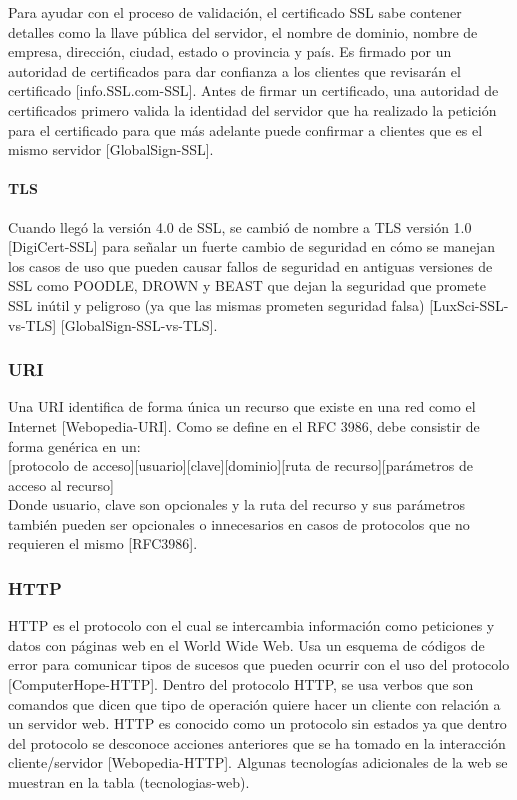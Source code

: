Para ayudar con el proceso de validación, el certificado SSL sabe contener detalles como la llave pública del servidor, el nombre de dominio, nombre de empresa, dirección, ciudad, estado o provincia y país. Es firmado por un autoridad de certificados para dar confianza a los clientes que revisarán el certificado [info.SSL.com-SSL]. Antes de firmar un certificado, una autoridad de certificados primero valida la identidad del servidor que ha realizado la petición para el certificado para que más adelante puede confirmar a clientes que es el mismo servidor [GlobalSign-SSL].

\paragraph{TLS}
Cuando llegó la versión 4.0 de SSL, se cambió de nombre a TLS versión 1.0 [DigiCert-SSL] para señalar un fuerte cambio de seguridad en cómo se manejan los casos de uso que pueden causar fallos de seguridad en antiguas versiones de SSL como POODLE, DROWN y BEAST que dejan la seguridad que promete SSL inútil y peligroso (ya que las mismas prometen seguridad falsa) [LuxSci-SSL-vs-TLS] [GlobalSign-SSL-vs-TLS].

\subsubsection{URI}
Una URI identifica de forma única un recurso que existe en una red como el Internet [Webopedia-URI]. Como se define en el RFC 3986, debe consistir de forma genérica en un:\\[1em]
[protocolo de acceso][usuario][clave][dominio][ruta de recurso][parámetros de acceso al recurso]\\[1em]
Donde usuario, clave son opcionales y la ruta del recurso y sus parámetros también pueden ser opcionales o innecesarios en casos de protocolos que no requieren el mismo [RFC3986].

\subsubsection{HTTP}
HTTP es el protocolo con el cual se intercambia información como peticiones y datos con páginas web en el World Wide Web. Usa un esquema de códigos de error para comunicar tipos de sucesos que pueden ocurrir con el uso del protocolo [ComputerHope-HTTP]. Dentro del protocolo HTTP, se usa verbos que son comandos que dicen que tipo de operación quiere hacer un cliente con relación a un servidor web. HTTP es conocido como un protocolo sin estados ya que dentro del protocolo se desconoce acciones anteriores que se ha tomado en la interacción cliente/servidor [Webopedia-HTTP]. Algunas tecnologías adicionales de la web se muestran en la tabla (tecnologias-web).


